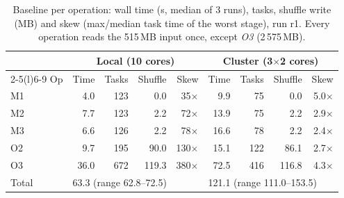 \documentclass[10pt,a4paper]{article}
\begin{document}
\begin{table}[!htb]
\centering\footnotesize
\caption{Baseline per operation: wall time (s, median of 3 runs), tasks, shuffle write (MB) and skew (max/median task time of the worst stage), run r1. Every operation reads the 515\,MB input once, except \textit{O3} (2\,575\,MB).}
\label{tab:baseline}
\begin{tabular}{@{}lrrrrrrrr@{}}
\toprule
& \multicolumn{4}{c}{Local (10 cores)} & \multicolumn{4}{c}{Cluster (3$\times$2 cores)} \\
\cmidrule(lr){2-5}\cmidrule(l){6-9}
Op & Time & Tasks & Shuffle & Skew & Time & Tasks & Shuffle & Skew \\
\midrule
M1 & 4.0  & 123 & 0.0   & 35$\times$  & 9.9  & 75  & 0.0   & 5.0$\times$ \\
M2 & 7.7  & 123 & 2.2   & 72$\times$  & 13.9 & 75  & 2.2   & 2.9$\times$ \\
M3 & 6.6  & 126 & 2.2   & 78$\times$  & 16.6 & 78  & 2.2   & 2.4$\times$ \\
O2 & 9.7  & 195 & 90.0  & 130$\times$ & 15.1 & 122 & 86.1  & 2.7$\times$ \\
O3 & 36.0 & 672 & 119.3 & 380$\times$ & 72.5 & 416 & 116.8 & 4.3$\times$ \\
\midrule
Total & \multicolumn{4}{l}{63.3 (range 62.8--72.5)} & \multicolumn{4}{l}{121.1 (range 111.0--153.5)} \\
\bottomrule
\end{tabular}
\end{table}
\end{document}
